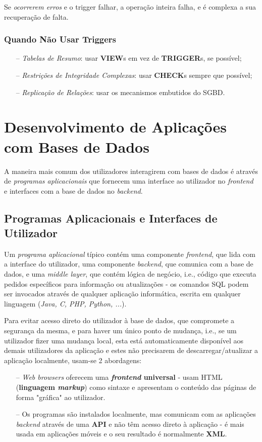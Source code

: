 \documentclass[oneside]{book}
\theoremstyle{definition}
\begin{document}
Se \textit{ocorrerem erros} e o trigger falhar, a operação inteira falha, e é complexa a sua recuperação de falta.

\subsection{Quando Não Usar Triggers}
\begin{itemize}
    \itemsep0cm
    \item[--] \textit{Tabelas de Resumo}: usar \textbf{VIEW}s em vez de \textbf{TRIGGER}s, se possível;
    \item[--] \textit{Restrições de Integridade Complexas}: usar \textbf{CHECK}s sempre que possível;
    \item[--] \textit{Replicação de Relações}: usar os mecanismos embutidos do SGBD.
\end{itemize}

\chapter{Desenvolvimento de Aplicações com Bases de Dados}
A maneira mais comum dos utilizadores interagirem com bases de dados é através de \textit{programas aplicacionais} que fornecem uma interface ao utilizador no \textit{frontend} e interfaces com a base de dados no \textit{backend}.

\section{Programas Aplicacionais e Interfaces de Utilizador}
Um \textit{programa aplicacional} típico contém uma componente \textit{frontend}, que lida com a interface do utilizador, uma componente \textit{backend}, que comunica com a base de dados, e uma \textit{middle layer}, que contém lógica de negócio, i.e., código que executa pedidos específicos para informação ou atualizações - os comandos SQL podem ser invocados através de qualquer aplicação informática, escrita em qualquer linguagem (\textit{Java, C, PHP, Python, ...}).

Para evitar acesso direto do utilizador à base de dados, que compromete a segurança da mesma, e para haver um único ponto de mudança, i.e., se um utilizador fizer uma mudança local, esta está automaticamente disponível aos demais utilizadores da aplicação e estes não precisarem de descarregar/atualizar a aplicação localmente, usam-se 2 abordagens:

\begin{itemize}
    \itemsep0cm
    \item[--] \textit{Web browsers} oferecem uma \textbf{\textit{frontend} universal} - usam HTML (\textbf{linguagem \textit{markup}}) como sintaxe e apresentam o conteúdo das páginas de forma "gráfica" ao utilizador.
    \item[--] Os programas são instalados localmente, mas comunicam com as aplicações \textit{backend} através de uma \textbf{API} e não têm acesso direto à aplicação - é mais usada em aplicações móveis e o seu resultado é normalmente \textbf{XML}.
\end{itemize}
\end{document}
